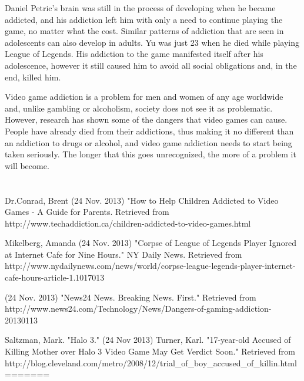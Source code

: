 \documentclass[a4paper,man,natbib]{apa6}
\renewcommand{\paragraph}{}
\begin{document}
\paragraph{}Daniel Petric’s brain was still in the process of developing when he became addicted, and his addiction left him with only a need to continue playing the game, no matter what the cost. Similar patterns of addiction that are seen in adolescents can also develop in adults. Yu was just 23 when he died while playing League of Legends. His addiction to the game manifested itself after his adolescence, however it still caused him to avoid all social obligations and, in the end, killed him.	

\paragraph{}Video game addiction is a problem for men and women of any age worldwide and, unlike gambling or alcoholism, society does not see it as problematic. However, research has shown some of the dangers that video games can cause. People have already died from their addictions, thus making it no different than an addiction to drugs or alcohol, and video game addiction needs to start being taken seriously. The longer that this goes unrecognized, the more of a problem it will become.

\section{}
Dr.Conrad, Brent (24 Nov. 2013) "How to Help Children Addicted to Video Games - A Guide for Parents. Retrieved from http://www.techaddiction.ca/children-addicted-to-video-games.html

Mikelberg, Amanda (24 Nov. 2013) "Corpse of League of Legends Player Ignored at Internet Cafe for Nine Hours." NY Daily News. Retrieved from http://www.nydailynews.com/news/world/corpse-league-legends-player-internet-cafe-hours-article-1.1017013

(24 Nov. 2013) "News24 News. Breaking News. First." Retrieved from http://www.news24.com/Technology/News/Dangers-of-gaming-addiction-20130113

Saltzman, Mark. "Halo 3." (24 Nov 2013) Turner, Karl. "17-year-old Accused of Killing Mother over Halo 3 Video Game May Get Verdict Soon." Retrieved from http://blog.cleveland.com/metro/2008/12/trial\_of\_boy\_accused\_of\_killin.html
=======
\end{document}
